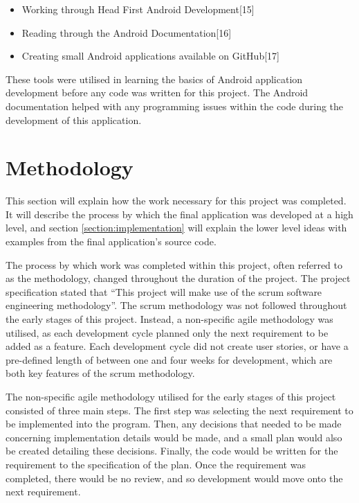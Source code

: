 \documentclass{article}
\begin{document}
\begin{itemize}
	\item Working through Head First Android Development[15]
	\item Reading through the Android Documentation[16]
	\item Creating small Android applications available on GitHub[17]
\end{itemize}

These tools were utilised in learning the basics of Android application development before any code was written for this project. The Android documentation helped with any programming issues within the code during the development of this application. 

\section{Methodology}
\label{section:methodology}

This section will explain how the work necessary for this project was completed. It will describe the process by which the final application was developed at a high level, and section \ref{section:implementation} will explain the lower level ideas with examples from the final application's source code. \par

The process by which work was completed within this project, often referred to as the methodology, changed throughout the duration of the project. The project specification stated that ``This project will make use of the scrum software engineering methodology''. The scrum methodology was not followed throughout the early stages of this project. Instead, a non-specific agile methodology was utilised, as each development cycle planned only the next requirement to be added as a feature. Each development cycle did not create user stories, or have a pre-defined length of between one and four weeks for development, which are both key features of the scrum methodology. \par

The non-specific agile methodology utilised for the early stages of this project consisted of three main steps. The first step was selecting the next requirement to be implemented into the program. Then, any decisions that needed to be made concerning implementation details would be made, and a small plan would also be created detailing these decisions. Finally, the code would be written for the requirement to the specification of the plan. Once the requirement was completed, there would be no review, and so development would move onto the next requirement. \par
\end{document}
